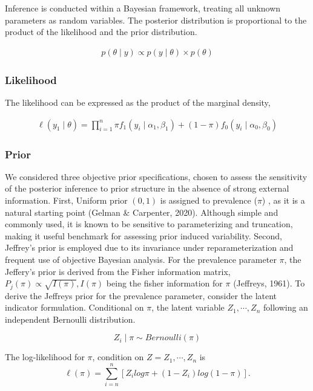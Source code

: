 \documentclass[11pt]{article}
\begin{document}
Inference is conducted within a Bayesian framework, treating all unknown parameters as random variables. The posterior distribution is proportional to the product of the likelihood and the prior distribution. 

\begin{align*}
	p(\theta \mid y) \propto p(y \mid \theta) \times p(\theta)
\end{align*}

\subsubsection*{\textbf{Likelihood}}

The likelihood can be expressed as the product of the marginal density,

\begin{align*}
	\ell (y_1 \mid \theta) = \prod_{i = 1}^{n}  \pi f_{1} (y_i \mid \alpha_1, \beta_1) + (1 - \pi) f_{0} (y_i \mid \alpha_0, \beta_0)
\end{align*}


\subsubsection*{\textbf{Prior}}

We considered three objective prior specifications, chosen to assess the sensitivity of the posterior inference to prior structure in the absence of strong external information.  First, Uniform prior $(0, 1)$ is assigned to prevalence ($\pi$) , as it is a natural starting point (Gelman \& Carpenter, 2020). Although simple and commonly used, it is known to be sensitive to parameterizing and truncation, making it useful benchmark for assessing prior induced variability. Second, Jeffrey's prior is employed due to its invariance under reparameterization and frequent use of objective Bayesian analysis. For the prevalence parameter $\pi$, the Jeffery's prior is derived from the Fisher information matrix, $P_j(\pi) \propto \sqrt{I(\pi)}, I(\pi)$ being the fisher information for $\pi$ (Jeffreys, 1961). To derive the Jeffreys prior for the prevalence parameter, consider the latent indicator formulation. Conditional on $\pi$, the latent variable $Z_1, \cdots, Z_n$ following an independent Bernoulli distribution. 

\[
Z_i \mid \pi \sim Bernoulli (\pi)
\]

The log-likelihood for $\pi$, condition on $Z = Z_1, \cdots, Z_n$ is 
\[
\ell (\pi) = \sum_{i = n}^{n}[Z_i log \pi +(1- Z_i) log(1 - \pi)].
\]
\end{document}
